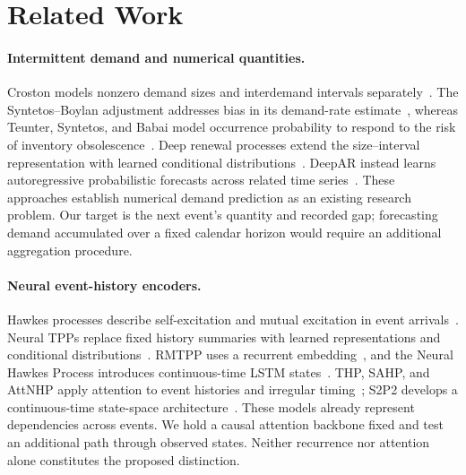 \documentclass[runningheads]{llncs}
\begin{document}
\section{Related Work}
\paragraph{Intermittent demand and numerical quantities.}
Croston models nonzero demand sizes and interdemand intervals separately~\cite{croston1972forecasting}. The Syntetos--Boylan adjustment addresses bias in its demand-rate estimate~\cite{syntetos2005accuracy}, whereas Teunter, Syntetos, and Babai model occurrence probability to respond to the risk of inventory obsolescence~\cite{teunter2011obsolescence}. Deep renewal processes extend the size--interval representation with learned conditional distributions~\cite{turkmen2021renewal}. DeepAR instead learns autoregressive probabilistic forecasts across related time series~\cite{salinas2020deepar}. These approaches establish numerical demand prediction as an existing research problem. Our target is the next event's quantity and recorded gap; forecasting demand accumulated over a fixed calendar horizon would require an additional aggregation procedure.

\paragraph{Neural event-history encoders.}
Hawkes processes describe self-excitation and mutual excitation in event arrivals~\cite{hawkes1971spectra}. Neural TPPs replace fixed history summaries with learned representations and conditional distributions~\cite{shchur2021review}. RMTPP uses a recurrent embedding~\cite{du2016rmtpp}, and the Neural Hawkes Process introduces continuous-time LSTM states~\cite{mei2017nhp}. THP, SAHP, and AttNHP apply attention to event histories and irregular timing~\cite{zuo2020thp,zhang2020sahp,yang2022anhp}; S2P2 develops a continuous-time state-space architecture~\cite{chang2025s2p2}. These models already represent dependencies across events. We hold a causal attention backbone fixed and test an additional path through observed states. Neither recurrence nor attention alone constitutes the proposed distinction.
\end{document}

